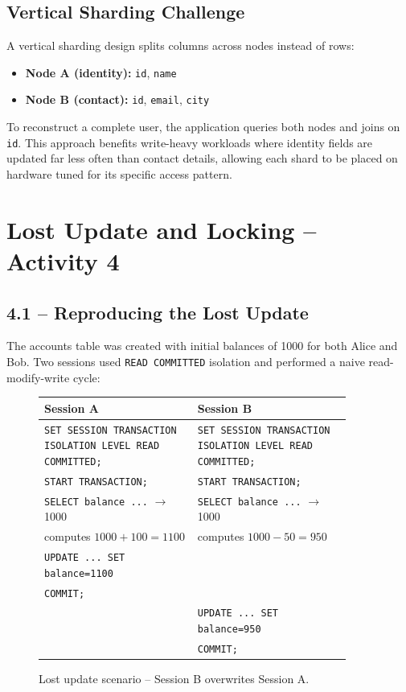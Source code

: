 \documentclass[12pt,a4paper]{article}
\begin{document}
\subsection{Vertical Sharding Challenge}

A vertical sharding design splits columns across nodes instead of rows:

\begin{itemize}
  \item \textbf{Node A (identity):} \texttt{id}, \texttt{name}
  \item \textbf{Node B (contact):} \texttt{id}, \texttt{email}, \texttt{city}
\end{itemize}

To reconstruct a complete user, the application queries both nodes and joins
on \texttt{id}.  This approach benefits write-heavy workloads where identity
fields are updated far less often than contact details, allowing each shard to
be placed on hardware tuned for its specific access pattern.

\section{Lost Update and Locking -- Activity 4}

\subsection{4.1 -- Reproducing the Lost Update}

The accounts table was created with initial balances of 1000 for both Alice
and Bob.  Two sessions used \texttt{READ COMMITTED} isolation and performed a
naive read-modify-write cycle:

\begin{figure}[H]
\centering
\begin{tabular}{p{0.45\linewidth}|p{0.45\linewidth}}
\textbf{Session A} & \textbf{Session B} \\
\hline
\texttt{SET SESSION TRANSACTION} \newline \texttt{ISOLATION LEVEL READ COMMITTED;} &
\texttt{SET SESSION TRANSACTION} \newline \texttt{ISOLATION LEVEL READ COMMITTED;} \\
\texttt{START TRANSACTION;} & \texttt{START TRANSACTION;} \\
\texttt{SELECT balance ...} $\to$ 1000 & \texttt{SELECT balance ...} $\to$ 1000 \\
computes $1000 + 100 = 1100$ & computes $1000 - 50 = 950$ \\
\texttt{UPDATE ... SET balance=1100} & \\
\texttt{COMMIT;} & \\
& \texttt{UPDATE ... SET balance=950} \\
& \texttt{COMMIT;} \\
\end{tabular}
\caption{Lost update scenario -- Session B overwrites Session A.}
\end{figure}
\end{document}

